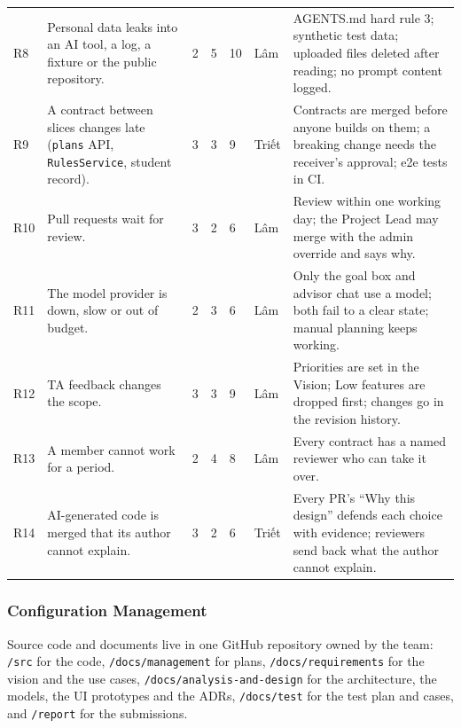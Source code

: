 \documentclass{article}
\newcommand{\chg}[1]{\textcolor{chg}{#1}}
\begin{document}
{\begin{xltabular}{\dimexpr{}\tabcolsep\relax}{@{}p{0.6cm}Yp{0.35cm}p{0.35cm}p{0.5cm}p{1.1cm}Y@{}}
R8 & Personal data leaks into an AI tool, a log, a fixture or the public repository. & 2 & 5 & 10 & Lâm & AGENTS.md hard
rule 3; synthetic test data; uploaded files deleted after reading; no prompt content logged.\\
R9 & A contract between slices changes late (\texttt{plans} API, \texttt{RulesService}, student record). & 3 & 3 & 9 &
Triết & Contracts are merged before anyone builds on them; a breaking change needs the receiver's approval; e2e tests in
CI.\\
R10 & Pull requests wait for review. & 3 & 2 & 6 & Lâm & Review within one working day; the Project Lead may merge with
the admin override and says why.\\
R11 & The model provider is down, slow or out of budget. & 2 & 3 & 6 & Lâm & Only the goal box and advisor chat use a
model; both fail to a clear state; manual planning keeps working.\\
R12 & TA feedback changes the scope. & 3 & 3 & 9 & Lâm & Priorities are set in the Vision; Low features are dropped first;
changes go in the revision history.\\
R13 & A member cannot work for a period. & 2 & 4 & 8 & Lâm & Every contract has a named reviewer who can take it over.\\
R14 & AI-generated code is merged that its author cannot explain. & 3 & 2 & 6 & Triết & Every PR's ``Why this design''
defends each choice with evidence; reviewers send back what the author cannot explain.\\
\end{xltabular}}

\subsubsection{Configuration Management}
Source code and documents live in one GitHub repository owned by the team: \texttt{/src} for the code,
\texttt{/docs/management} for plans, \texttt{/docs/requirements} for the vision and the use cases,
\texttt{/docs/analysis-and-design} for the architecture, the models, the UI prototypes \chg{and the ADRs},
\texttt{/docs/test} for the test plan and cases, and \texttt{/report} for the submissions.
\end{document}

